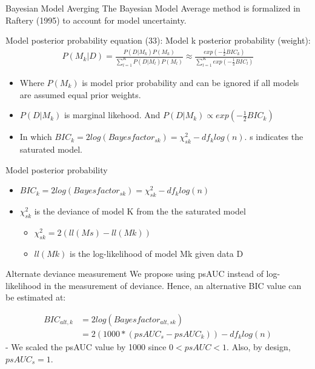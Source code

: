 \documentclass[
  ignorenonframetext,
]{beamer}
\providecommand{\tightlist}{%
  \setlength{\itemsep}{0pt}\setlength{\parskip}{0pt}}
\begin{document}
\begin{frame}{Bayesian Model Averging}
\protect\hypertarget{bayesian-model-averging}{}
The Bayesian Model Average method is formalized in Raftery (1995) to
account for model uncertainty.

\begin{block}{Model posterior probability}
\protect\hypertarget{model-posterior-probability}{}
equation (33): Model k posterior probability (weight): \begin{align}
  P(M_k|D) = \frac{P(D|M_k)P(M_k)}{\sum\nolimits_{l=1}^K P(D|M_l)P(M_l)} 
  \approx \frac{exp(-\frac{1}{2}BIC_k)}{\sum\nolimits_{l=1}^K exp(-\frac{1}{2}BIC_l)}
\end{align}

\begin{itemize}
\item
  Where \(P(M_k)\) is model prior probability and can be ignored if all
  models are assumed equal prior weights.
\item
  \(P(D|M_k)\) is marginal likehood. And
  \(P(D|M_k) \propto exp(-\frac{1}{2}BIC_k)\)
\item
  In which
  \(BIC_k = 2log (Bayesfactor_{sk}) = \chi^2_{sk} - df_klog(n)\). s
  indicates the saturated model.
\end{itemize}
\end{block}
\end{frame}

\begin{frame}{Model posterior probability}
\protect\hypertarget{model-posterior-probability-1}{}
\begin{itemize}
\tightlist
\item
  \(BIC_k = 2log (Bayesfactor_{sk}) = \chi^2_{sk} - df_klog(n)\)
\item
  \(\chi^2_{sk}\) is the deviance of model K from the the saturated
  model

  \begin{itemize}
  \tightlist
  \item
    \(\chi^2_{sk} = 2(ll(Ms) - ll(Mk))\)
  \item
    \(ll(Mk)\) is the log-likelihood of model Mk given data D
  \end{itemize}
\end{itemize}

\begin{block}{Alternate deviance measurement}
\protect\hypertarget{alternate-deviance-measurement}{}
We propose using psAUC instead of log-likelihood in the measurement of
deviance. Hence, an alternative BIC value can be estimated at:

\begin{align}
BIC_{alt,k} &= 2log (Bayesfactor_{alt,sk}) \\
&= 2(1000*(psAUC_s-psAUC_k)) - df_klog(n)
\end{align} - We scaled the psAUC value by 1000 since \(0<psAUC<1\).
Also, by design, \(psAUC_s=1\).
\end{block}
\end{frame}
\end{document}
